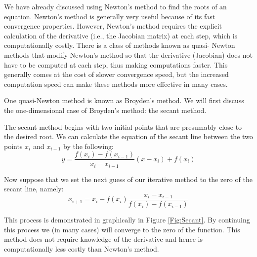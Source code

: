 

We have already discussed using Newton's method to find the roots of an
equation. Newton's method is generally very useful because of its fast
convergence properties. However, Newton's method requires the explicit
calculation of the derivative (i.e., the Jacobian matrix) at each step,
which is computationally costly. There is a class of methods known as quasi-
Newton methods that modify Newton's method so that the derivative (Jacobian)
does not have to be computed at each step, thus making computations faster.
This generally comes at the cost of slower convergence speed, but the increased
computation speed can make these methods more effective in many cases.

One quasi-Newton method is known as Broyden's method. We will first discuss the
one-dimensional case of Broyden's method: the secant method.

The secant method begins with two initial points that are presumably close to
the desired root. We can calculate the equation of the secant line between the
two points $x_i$ and $x_{i-1}$ by the following: \[ y = \frac{f(x_i)-f(x_{i-1
})}{x_i-x_{i-1}}(x-x_i) + f(x_i) \]

Now suppose that we set the next guess of our iterative method to the zero of
the secant line, namely: \[ x_{i+1} = x_i - f(x_i)\frac{x_i-
x_{i-1}}{f(x_i)-f(x_{i-1})} \]

This process is demonstrated in graphically in Figure \ref{Fig:Secant}.  By
continuing this process we (in many cases) will converge to the zero of the
function. This method does not require knowledge of the derivative and hence is
computationally less costly than Newton's method.

% 
% 


